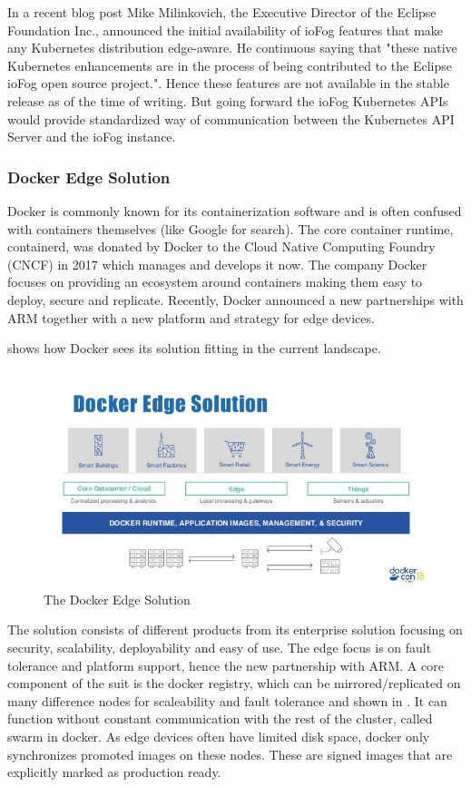 In a recent blog post Mike Milinkovich, the Executive Director of the Eclipse Foundation Inc., announced the initial availability of ioFog features that make any Kubernetes distribution edge-aware. He continuous saying that "these native Kubernetes enhancements are in the process of being contributed to the Eclipse ioFog open source project.". Hence these features are not available in the stable release as of the time of writing. But going forward the ioFog Kubernetes APIs would provide standardized way of communication between the Kubernetes API Server and the ioFog instance.

\subsubsection{Docker Edge Solution}
Docker is commonly known for its containerization software and is often confused with containers themselves (like Google for search). The core container runtime, containerd, was donated by Docker to the Cloud Native Computing Foundry (CNCF) in 2017\cite{containerDonationDocker79:online} which manages and develops it now. The company Docker focuses on providing an ecosystem around containers making them easy to deploy, secure and replicate. Recently, Docker announced a new partnerships with ARM together with a new platform and strategy for edge devices.

 shows how Docker sees its solution fitting in the current landscape.
\begin{figure}[!ht]
    \centering
    \includegraphics[scale=0.65]{figures/docker-edge-solution.jpg}
    \caption{The Docker Edge Solution}
    \label{fig:dockerEdge}
\end{figure}


The solution consists of different products from its enterprise solution focusing on security, scalability, deployability and easy of use. The edge focus is on fault tolerance and platform support, hence the new partnership with ARM. A core component of the suit is the docker registry, which can be mirrored/replicated on many difference nodes for scaleability and fault tolerance and shown in . It can function without constant communication with the rest of the cluster, called swarm in docker. As edge devices often have limited disk space, docker only synchronizes promoted images on these nodes. These are signed images that are explicitly marked as production ready.

